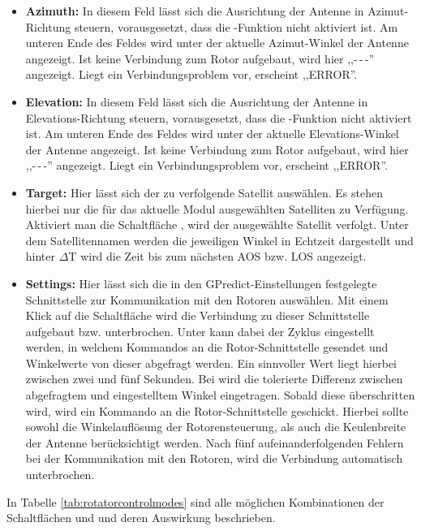 \begin{itemize}
	\parskip0pt
	\item \textbf{Azimuth:} In diesem Feld lässt sich die Ausrichtung der Antenne in Azimut-Richtung steuern, vorausgesetzt, dass die -Funktion nicht aktiviert ist. Am unteren Ende des Feldes wird unter  der aktuelle Azimut-Winkel der Antenne angezeigt. Ist keine Verbindung zum Rotor aufgebaut, wird hier ,,-\,-\,-'' angezeigt. Liegt ein Verbindungsproblem vor, erscheint ,,ERROR''.
	\item \textbf{Elevation:} In diesem Feld lässt sich die Ausrichtung der Antenne in Elevations-Richtung steuern, vorausgesetzt, dass die -Funktion nicht aktiviert ist. Am unteren Ende des Feldes wird unter  der aktuelle Elevations-Winkel der Antenne angezeigt. Ist keine Verbindung zum Rotor aufgebaut, wird hier ,,-\,-\,-'' angezeigt. Liegt ein Verbindungsproblem vor, erscheint ,,ERROR''.
	\item \textbf{Target:} Hier lässt sich der zu verfolgende Satellit auswählen. Es stehen hierbei nur die für das aktuelle Modul ausgewählten Satelliten zu Verfügung. Aktiviert man die Schaltfläche , wird der ausgewählte Satellit verfolgt. Unter dem Satellitennamen werden die jeweiligen Winkel in Echtzeit dargestellt und hinter $\Delta$T wird die Zeit bis zum nächsten \ac{AOS} bzw. \ac{LOS} angezeigt.
	\clearpage
	\item \textbf{Settings:} Hier lässt sich die in den GPredict-Einstellungen festgelegte Schnittstelle zur Kommunikation mit den Rotoren auswählen. Mit einem Klick auf die Schaltfläche  wird die Verbindung zu dieser Schnittstelle aufgebaut bzw. unterbrochen. Unter  kann dabei der Zyklus eingestellt werden, in welchem Kommandos an die Rotor-Schnittstelle gesendet und Winkelwerte von dieser abgefragt werden. Ein sinnvoller Wert liegt hierbei zwischen zwei und fünf Sekunden. Bei  wird die tolerierte Differenz zwischen abgefragtem und eingestelltem Winkel eingetragen. Sobald diese überschritten wird, wird ein  Kommando an die Rotor-Schnittstelle geschickt. Hierbei sollte sowohl die Winkelauflösung der Rotorensteuerung, als auch die Keulenbreite der Antenne berücksichtigt werden. Nach fünf aufeinanderfolgenden Fehlern bei der Kommunikation mit den Rotoren, wird die Verbindung automatisch unterbrochen.
\end{itemize}

In Tabelle \ref{tab:rotatorcontrolmodes} sind alle möglichen Kombinationen der Schaltflächen  und  und deren Auswirkung beschrieben.

